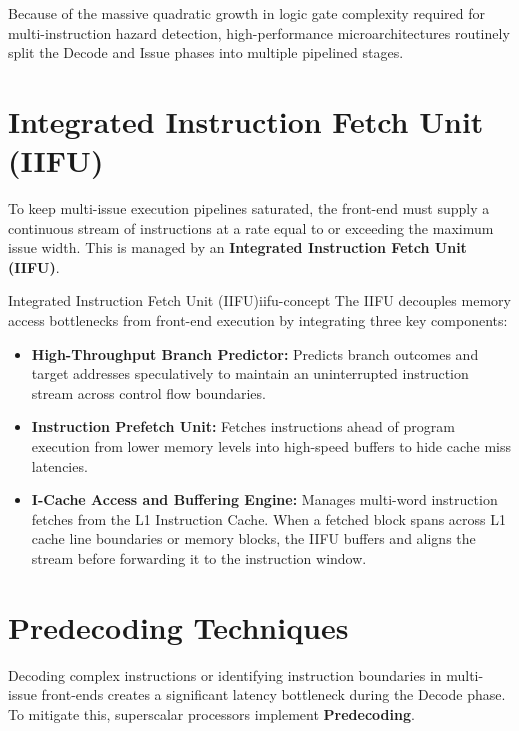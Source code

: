 Because of the massive quadratic growth in logic gate complexity required for multi-instruction hazard detection, high-performance microarchitectures routinely split the Decode and Issue phases into multiple pipelined stages.

\section{Integrated Instruction Fetch Unit (IIFU)}
\label{sec:iifu}

To keep multi-issue execution pipelines saturated, the front-end must supply a continuous stream of instructions at a rate equal to or exceeding the maximum issue width. This is managed by an \textbf{Integrated Instruction Fetch Unit (IIFU)}.

\begin{concept}{Integrated Instruction Fetch Unit (IIFU)}{iifu-concept}
The IIFU decouples memory access bottlenecks from front-end execution by integrating three key components:
\begin{itemize}
    \item \textbf{High-Throughput Branch Predictor:} Predicts branch outcomes and target addresses speculatively to maintain an uninterrupted instruction stream across control flow boundaries.
    \item \textbf{Instruction Prefetch Unit:} Fetches instructions ahead of program execution from lower memory levels into high-speed buffers to hide cache miss latencies.
    \item \textbf{I-Cache Access and Buffering Engine:} Manages multi-word instruction fetches from the L1 Instruction Cache. When a fetched block spans across L1 cache line boundaries or memory blocks, the IIFU buffers and aligns the stream before forwarding it to the instruction window.
\end{itemize}
\end{concept}

\section{Predecoding Techniques}
\label{sec:predecoding}

Decoding complex instructions or identifying instruction boundaries in multi-issue front-ends creates a significant latency bottleneck during the Decode phase. To mitigate this, superscalar processors implement \textbf{Predecoding}.

